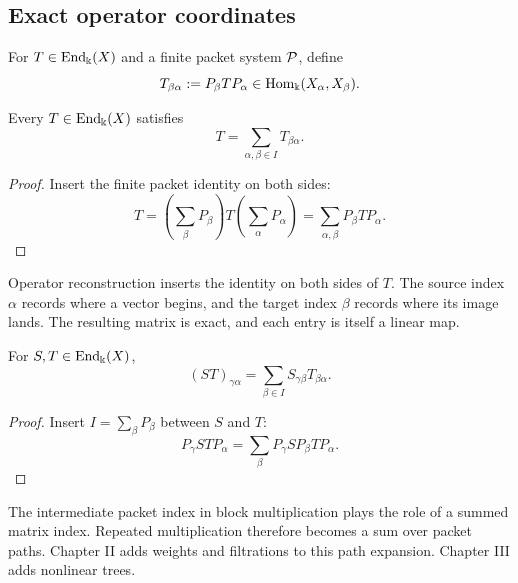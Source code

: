 \subsection{Exact operator coordinates}

\begin{definition}
\label{def:transfer-block}
For $T\in\operatorname{End}_{\Bbbk}(X)$ and a finite packet system $\mathcal P$, define
\[
T_{\beta\alpha}:=P_\beta TP_\alpha
\in\operatorname{Hom}_{\Bbbk}(X_\alpha,X_\beta).
\]
\end{definition}

\begin{theorem}
\label{thm:operator-reconstruction}
Every $T\in\operatorname{End}_{\Bbbk}(X)$ satisfies
\[
\boxed{T=\sum_{\alpha,\beta\in I}T_{\beta\alpha}.}
\]
\end{theorem}

\begin{proof}
Insert the finite packet identity on both sides:
\[
T=
\left(\sum_\beta P_\beta\right)
T
\left(\sum_\alpha P_\alpha\right)
=
\sum_{\alpha,\beta}P_\beta TP_\alpha.
\]
\end{proof}

\begin{interpretation}
Operator reconstruction inserts the identity on both sides of \(T\).  The source index \(\alpha\) records where a vector begins, and the target index \(\beta\) records where its image lands.  The resulting matrix is exact, and each entry is itself a linear map.
\end{interpretation}


\begin{theorem}
\label{thm:block-multiplication}
For $S,T\in\operatorname{End}_{\Bbbk}(X)$,
\[
\boxed{
(ST)_{\gamma\alpha}
=
\sum_{\beta\in I}S_{\gamma\beta}T_{\beta\alpha}.
}
\]
\end{theorem}

\begin{proof}
Insert $I=\sum_\beta P_\beta$ between $S$ and $T$:
\[
P_\gamma STP_\alpha
=
\sum_\beta
P_\gamma SP_\beta TP_\alpha.
\]
\end{proof}

\begin{keyidea}
The intermediate packet index in block multiplication plays the role of a summed matrix index.  Repeated multiplication therefore becomes a sum over packet paths.  Chapter II adds weights and filtrations to this path expansion.  Chapter III adds nonlinear trees.
\end{keyidea}


